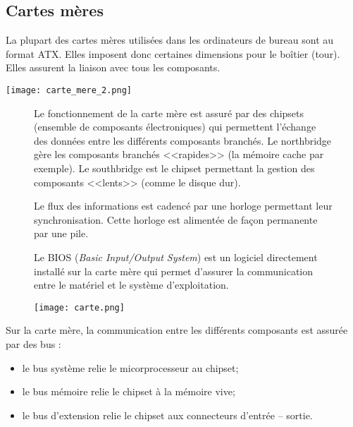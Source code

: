 \subsection{Cartes mères}

La plupart des cartes mères utilisées dans les ordinateurs de bureau sont au format ATX. Elles imposent donc certaines dimensions pour le boîtier (tour). Elles assurent la liaison avec tous les composants.

\begin{center}
\texttt{[image: carte\_mere\_2.png]}
\end{center}




\begin{figure}[h]
\begin{minipage}[c]{.49\linewidth}

Le fonctionnement de la carte mère est assuré par des chipsets (ensemble de composants électroniques) qui permettent l'échange des données entre les différents composants branchés. Le northbridge gère les composants branchés <<rapides>> (la mémoire cache par exemple). Le southbridge est le chipset permettant la gestion des composants <<lents>> (comme le disque dur). 

Le flux des informations est cadencé par une horloge permettant leur synchronisation. Cette horloge est alimentée de façon permanente par une pile. 

Le BIOS (\textit{Basic Input/Output System}) est un logiciel directement installé sur la carte mère qui permet d'assurer la communication entre le matériel et le système d'exploitation. 

\end{minipage} \hfill
\begin{minipage}[c]{.49\linewidth}
\begin{center}
\texttt{[image: carte.png]}
\label{}
\end{center}
\end{minipage}
\end{figure}

Sur la carte mère, la communication entre les différents composants est assurée par des bus :
\begin{itemize}
\item le bus système relie le micorprocesseur au chipset;
\item le bus mémoire relie le chipset à la mémoire vive;
\item le bus d'extension relie le chipset aux connecteurs d'entrée -- sortie.
\end{itemize}

